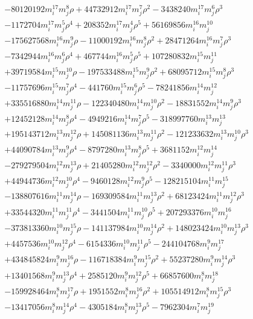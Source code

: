 {\begin{align*}
&-80120192m_i^{17}m_j^{8}\rho+44732912m_i^{17}m_j^{7}\rho^{2}-3438240m_i^{17}m_j^{6}\rho^{3}\\
&-1172704m_i^{17}m_j^{5}\rho^{4}+208352m_i^{17}m_j^{4}\rho^{5}+56169856m_i^{16}m_j^{10}\\
&-175627568m_i^{16}m_j^{9}\rho-11000192m_i^{16}m_j^{8}\rho^{2}+28471264m_i^{16}m_j^{7}\rho^{3}\\
&-7342944m_i^{16}m_j^{6}\rho^{4}+467744m_i^{16}m_j^{5}\rho^{5}+107280832m_i^{15}m_j^{11}\\
&+39719584m_i^{15}m_j^{10}\rho-197533488m_i^{15}m_j^{9}\rho^{2}+68095712m_i^{15}m_j^{8}\rho^{3}\\
&-11757696m_i^{15}m_j^{7}\rho^{4}-441760m_i^{15}m_j^{6}\rho^{5}-78241856m_i^{14}m_j^{12}\\
&+335516880m_i^{14}m_j^{11}\rho-122340480m_i^{14}m_j^{10}\rho^{2}-18831552m_i^{14}m_j^{9}\rho^{3}\\
&+12452128m_i^{14}m_j^{8}\rho^{4}-4949216m_i^{14}m_j^{7}\rho^{5}-318997760m_i^{13}m_j^{13}\\
&+195143712m_i^{13}m_j^{12}\rho+145081136m_i^{13}m_j^{11}\rho^{2}-121233632m_i^{13}m_j^{10}\rho^{3}\\
&+44090784m_i^{13}m_j^{9}\rho^{4}-8797280m_i^{13}m_j^{8}\rho^{5}+3681152m_i^{12}m_j^{14}\\
&-279279504m_i^{12}m_j^{13}\rho+21405280m_i^{12}m_j^{12}\rho^{2}-3340000m_i^{12}m_j^{11}\rho^{3}\\
&+44944736m_i^{12}m_j^{10}\rho^{4}-9460128m_i^{12}m_j^{9}\rho^{5}-128215104m_i^{11}m_j^{15}\\
&-138807616m_i^{11}m_j^{14}\rho-169309584m_i^{11}m_j^{13}\rho^{2}+68123424m_i^{11}m_j^{12}\rho^{3}\\
&+33544320m_i^{11}m_j^{11}\rho^{4}-3441504m_i^{11}m_j^{10}\rho^{5}+207293376m_i^{10}m_j^{16}\\
&-373813360m_i^{10}m_j^{15}\rho-141137984m_i^{10}m_j^{14}\rho^{2}+148023424m_i^{10}m_j^{13}\rho^{3}\\
&+4457536m_i^{10}m_j^{12}\rho^{4}-6154336m_i^{10}m_j^{11}\rho^{5}-244104768m_i^{9}m_j^{17}\\
&+434845824m_i^{9}m_j^{16}\rho-116718384m_i^{9}m_j^{15}\rho^{2}+55237280m_i^{9}m_j^{14}\rho^{3}\\
&+13401568m_i^{9}m_j^{13}\rho^{4}+2585120m_i^{9}m_j^{12}\rho^{5}+66857600m_i^{8}m_j^{18}\\
&-159928464m_i^{8}m_j^{17}\rho+1951552m_i^{8}m_j^{16}\rho^{2}+105514912m_i^{8}m_j^{15}\rho^{3}\\
&-13417056m_i^{8}m_j^{14}\rho^{4}-4305184m_i^{8}m_j^{13}\rho^{5}-7962304m_i^{7}m_j^{19}\\

\end{align*}}
